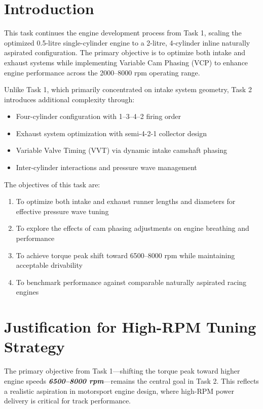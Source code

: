 \label{ch:task2}

\section{Introduction}

This task continues the engine development process from Task 1, scaling the optimized 0.5-litre single-cylinder engine to a 2-litre, 4-cylinder inline naturally aspirated configuration. The primary objective is to optimize both intake and exhaust systems while implementing Variable Cam Phasing (VCP) to enhance engine performance across the 2000--8000 rpm operating range.

Unlike Task 1, which primarily concentrated on intake system geometry, Task 2 introduces additional complexity through:
\begin{itemize}
    \item Four-cylinder configuration with 1--3--4--2 firing order
    \item Exhaust system optimization with semi-4-2-1 collector design
    \item Variable Valve Timing (VVT) via dynamic intake camshaft phasing
    \item Inter-cylinder interactions and pressure wave management
\end{itemize}

The objectives of this task are:
\begin{enumerate}
    \item To optimize both intake and exhaust runner lengths and diameters for effective pressure wave tuning
    \item To explore the effects of cam phasing adjustments on engine breathing and performance
    \item To achieve torque peak shift toward 6500--8000 rpm while maintaining acceptable drivability
    \item To benchmark performance against comparable naturally aspirated racing engines
\end{enumerate}

\section{Justification for High-RPM Tuning Strategy}

The primary objective from Task 1—shifting the torque peak toward higher engine speeds \textbf{\textit{6500–8000 rpm}}—remains the central goal in Task 2. This reflects a realistic aspiration in motorsport engine design, where high-RPM power delivery is critical for track performance.


